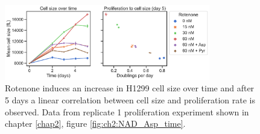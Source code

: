 \begin{figure}
    \centering
    \includegraphics[width=0.8\textwidth]{figures/chap6/cell-size-time_prlfr.pdf}
    \caption[Rotenone induced cell size increase over time.]{
    Rotenone induces an increase in H1299 cell size over time and after 5 days a linear correlation between cell size and proliferation rate is observed.
    Data from replicate 1 proliferation experiment shown in chapter \ref{chap2}, figure \ref{fig:ch2:NAD_Asp_time}.
    }
    \label{fig:ch6:cell_size_time_prlfr}
\end{figure}

